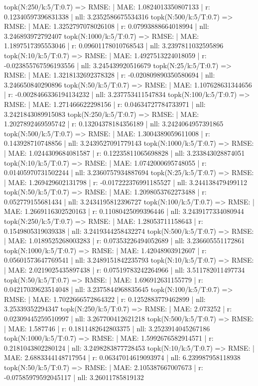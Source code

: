 topk(N:250/k:5/T:0.7) => RMSE: | MAE: 1.0824013350807133 | r: 0.12340597396831338 | nll: 3.2352586675534316
topk(N:500/k:5/T:0.7) => RMSE: | MAE: 1.3252797078026108 | r: 0.07993888664018994 | nll: 3.246893972792407
topk(N:1000/k:5/T:0.7) => RMSE: | MAE: 1.1897517395553046 | r: 0.09601178010768543 | nll: 3.2397811032595896
topk(N:10/k:5/T:0.7) => RMSE: | MAE: 1.4927513224018059 | r: -0.023855767596193556 | nll: 3.245439920516679
topk(N:25/k:5/T:0.7) => RMSE: | MAE: 1.3218132692378328 | r: -0.020809890350580694 | nll: 3.246650840290896
topk(N:50/k:5/T:0.7) => RMSE: | MAE: 1.107628631344656 | r: -0.0028466336194134232 | nll: 3.237753411547834
topk(N:100/k:5/T:0.7) => RMSE: | MAE: 1.271466622298156 | r: 0.04634727784733971 | nll: 3.2421843089915083
topk(N:250/k:5/T:0.7) => RMSE: | MAE: 1.2027892469595742 | r: 0.13204378184356189 | nll: 3.2424064957391865
topk(N:500/k:5/T:0.7) => RMSE: | MAE: 1.3004389059611008 | r: 0.143928710748856 | nll: 3.2439527091779143
topk(N:1000/k:5/T:0.7) => RMSE: | MAE: 1.0244309684081587 | r: 0.12235811065698828 | nll: 3.233843028874051
topk(N:10/k:5/T:0.7) => RMSE: | MAE: 1.0742000695748055 | r: 0.01405970731502244 | nll: 3.2360757934887694
topk(N:25/k:5/T:0.7) => RMSE: | MAE: 1.269429602131798 | r: -0.017222376991185527 | nll: 3.244138479499112
topk(N:50/k:5/T:0.7) => RMSE: | MAE: 1.2098053762273488 | r: 0.052779155681434 | nll: 3.2434195812396727
topk(N:100/k:5/T:0.7) => RMSE: | MAE: 1.2669116302520163 | r: 0.11080425099396446 | nll: 3.2439177334080944
topk(N:250/k:5/T:0.7) => RMSE: | MAE: 1.28053711158643 | r: 0.1549805319039338 | nll: 3.2419344258432274
topk(N:500/k:5/T:0.7) => RMSE: | MAE: 1.0189525268003283 | r: 0.07353226494052689 | nll: 3.236605551172861
topk(N:1000/k:5/T:0.7) => RMSE: | MAE: 1.42048903912607 | r: 0.05601573647769541 | nll: 3.2489151842235793
topk(N:10/k:5/T:0.7) => RMSE: | MAE: 2.0219025435897438 | r: 0.07519783242264966 | nll: 3.511782011497734
topk(N:50/k:5/T:0.7) => RMSE: | MAE: 1.696912631155779 | r: 0.04217039623514048 | nll: 3.2375844968835645
topk(N:100/k:5/T:0.7) => RMSE: | MAE: 1.7022666572864322 | r: 0.1252883779462899 | nll: 3.25339352294347
topk(N:250/k:5/T:0.7) => RMSE: | MAE: 2.073252 | r: 0.02309445259510997 | nll: 3.267700412621218
topk(N:500/k:5/T:0.7) => RMSE: | MAE: 1.587746 | r: 0.1811482642803375 | nll: 3.2523914045267186
topk(N:1000/k:5/T:0.7) => RMSE: | MAE: 1.5992676582914571 | r: 0.2181043802280124 | nll: 3.2498283877728453
topk(N:10/k:5/T:0.7) => RMSE: | MAE: 2.6883344148717954 | r: 0.06347014619093974 | nll: 6.239987958118938
topk(N:50/k:5/T:0.7) => RMSE: | MAE: 2.105387667007673 | r: -0.07585979592045117 | nll: 3.26011785819132
